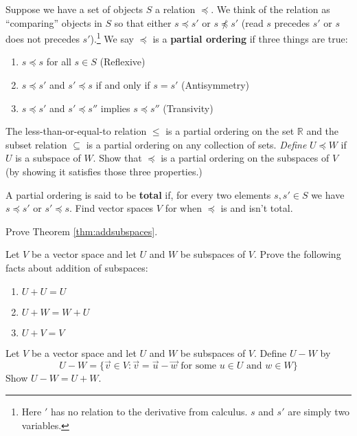 \begin{problem}
	Suppose we have a set of objects $S$ a relation $\preceq$. We think of the relation as ``comparing'' objects in $S$ so that either $s \preceq s'$ or $s \not\preceq s'$ (read $s$ precedes $s'$ or $s$ does not precedes $s'$).\footnote{Here $'$ has no relation to the derivative from calculus. $s$ and $s'$ are simply two variables.} We say $\preceq$ is a \textbf{partial ordering} if three things are true:
	\begin{enumerate}
		\item $s \preceq s$ for all $s \in S$ (Reflexive)
		\item $s \preceq s'$ and $s' \preceq s$ if and only if $s = s'$ (Antisymmetry)
		\item $s \preceq s'$ and $s' \preceq s''$ implies $s \preceq s''$ (Transivity)
	\end{enumerate}
	The less-than-or-equal-to relation $\leq$ is a partial ordering on the set $\mathbb{R}$ and the subset relation $\subseteq$ is a partial ordering on any collection of sets. \textit{Define }$U \preceq W$ if $U$ is a subspace of $W$. Show that $\preceq$ is a partial ordering on the subspaces of $V$ (by showing it satisfies those three properties.)
	
	A partial ordering is said to be \textbf{total} if, for every two elements $s,s' \in S$ we have $s \preceq s'$ or $s' \preceq s$. Find vector spaces $V$ for when $\preceq$ is and isn't total.
\end{problem}

\begin{problem}
	Prove Theorem \ref{thm:addsubspaces}.
\end{problem}

\begin{problem}
	Let $V$ be a vector space and let $U$ and $W$ be subspaces of $V$. Prove the following facts about addition of subspaces:
	\begin{enumerate}
		\item $U + U = U$
		\item $U + W = W + U$
		\item $U + V = V$
	\end{enumerate}
\end{problem}

\begin{problem}
	Let $V$ be a vector space and let $U$ and $W$ be subspaces of $V$. Define $U - W$ by
	$$U - W = \{ \vec{v} \in V : \vec{v} = \vec{u} - \vec{w} \text{ for some } u \in U \text{ and } w \in W \}$$
	Show $U - W = U + W$.
\end{problem}

